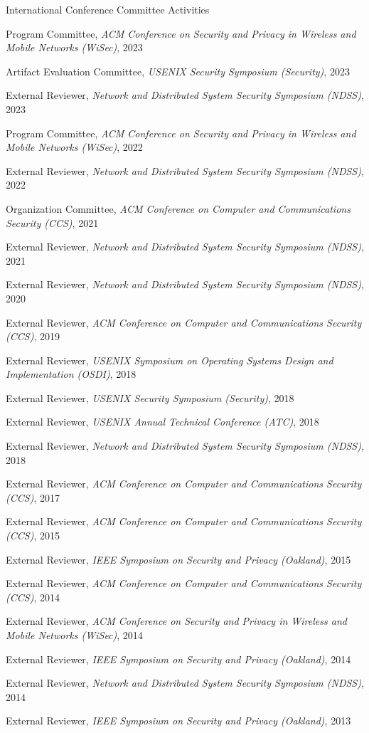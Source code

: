 \documentclass[11pt,letterpaper]{article}
\begin{document}
\begin{topic}{International Conference Committee Activities}{}
  \item{Program Committee, \emph{ACM Conference on Security and Privacy in Wireless and Mobile Networks (WiSec)}, 2023}
  \item{Artifact Evaluation Committee, \emph{USENIX Security Symposium (Security)}, 2023}
  \item{External Reviewer, \emph{Network and Distributed System Security Symposium (NDSS)}, 2023}
  \item{Program Committee, \emph{ACM Conference on Security and Privacy in Wireless and Mobile Networks (WiSec)}, 2022}
  \item{External Reviewer, \emph{Network and Distributed System Security Symposium (NDSS)}, 2022}
  \item{Organization Committee, \emph{ACM Conference on Computer and Communications Security (CCS)}, 2021}
  \item{External Reviewer, \emph{Network and Distributed System Security Symposium (NDSS)}, 2021}
  \item{External Reviewer, \emph{Network and Distributed System Security Symposium (NDSS)}, 2020}
  \item{External Reviewer, \emph{ACM Conference on Computer and Communications Security (CCS)}, 2019}
  \item{External Reviewer, \emph{USENIX Symposium on Operating Systems Design and Implementation (OSDI)}, 2018}
  \item{External Reviewer, \emph{USENIX Security Symposium (Security)}, 2018}
  \item{External Reviewer, \emph{USENIX Annual Technical Conference (ATC)}, 2018}
  \item{External Reviewer, \emph{Network and Distributed System Security Symposium (NDSS)}, 2018}
  \item{External Reviewer, \emph{ACM Conference on Computer and Communications Security (CCS)}, 2017}
  \item{External Reviewer, \emph{ACM Conference on Computer and Communications Security (CCS)}, 2015}
  \item{External Reviewer, \emph{IEEE Symposium on Security and Privacy (Oakland)}, 2015}
  \item{External Reviewer, \emph{ACM Conference on Computer and Communications Security (CCS)}, 2014}
  \item{External Reviewer, \emph{ACM Conference on Security and Privacy in Wireless and Mobile Networks (WiSec)}, 2014}
  \item{External Reviewer, \emph{IEEE Symposium on Security and Privacy (Oakland)}, 2014}
  \item{External Reviewer, \emph{Network and Distributed System Security Symposium (NDSS)}, 2014}
  \item{External Reviewer, \emph{IEEE Symposium on Security and Privacy (Oakland)}, 2013}
\end{topic}
\end{document}
